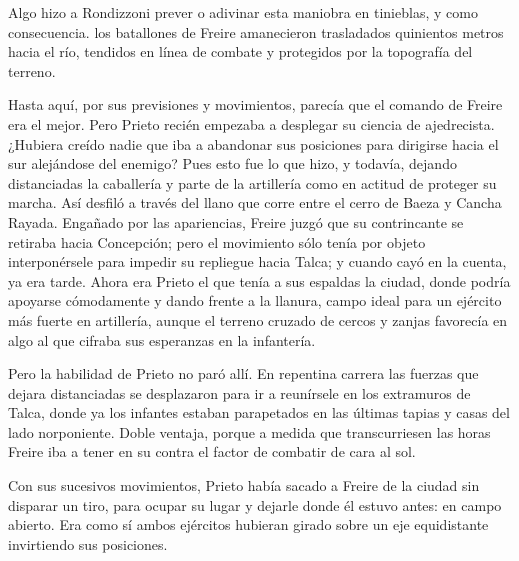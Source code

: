 \documentclass[10pt,twoside,openright]{memoir}
\begin{document}
Algo hizo a Rondizzoni prever o adivinar esta maniobra en tinieblas, y
como consecuencia. los batallones de Freire amanecieron trasladados
quinientos metros hacia el río, tendidos en línea de combate y
protegidos por la topografía del terreno.


Hasta aquí, por sus previsiones y movimientos, parecía que el comando de
Freire era el mejor. Pero Prieto recién empezaba a desplegar su ciencia
de ajedrecista. ¿Hubiera creído nadie que iba a abandonar sus posiciones
para dirigirse hacia el sur alejándose del enemigo? Pues esto fue lo que
hizo, y todavía, dejando distanciadas la caballería y parte de la
artillería como en actitud de proteger su marcha.
Así desfiló a través del llano que
corre entre el cerro de Baeza y Cancha Rayada. Engañado por las
apariencias, Freire juzgó que su contrincante se retiraba hacia
Concepción; pero el movimiento sólo tenía por objeto interponérsele para
impedir su repliegue hacia Talca; y cuando cayó en la cuenta, ya era
tarde. Ahora era Prieto el que tenía a sus espaldas la ciudad, donde
podría apoyarse cómodamente y dando frente a la llanura, campo ideal
para un ejército más fuerte en
artillería, aunque el terreno cruzado de cercos y zanjas favorecía en
algo al que cifraba sus esperanzas en la infantería.

Pero la habilidad de Prieto no paró
allí. En repentina carrera las fuerzas que dejara
distanciadas se desplazaron para ir a
reunírsele en los extramuros de Talca, donde ya los infantes estaban
parapetados en las últimas tapias y casas del lado norponiente. Doble
ventaja, porque a medida que transcurriesen las horas Freire iba a tener
en su contra el factor de combatir de cara al
sol.

Con sus sucesivos movimientos, Prieto había sacado a Freire de la ciudad
sin disparar un tiro, para ocupar su lugar y dejarle donde él estuvo
antes: en campo abierto. Era como sí ambos ejércitos hubieran girado
sobre un eje equidistante invirtiendo sus posiciones.
\end{document}
